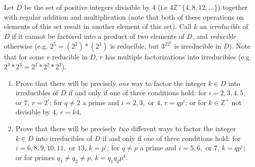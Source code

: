 \documentclass[letterpaper,12pt]{article}
\def\Z{\mathbb Z}
\begin{document}
Let $D$ be the set of positive integers divisible by 4 (i.e $4\Z^+\{4,8,12,\dots\}$) together with regular addition and multiplication (note that both of these operations on elements of this set result in another element of this set).
Call $k$ an \emph{irreducible} of $D$ if it cannot be factored into a product of two elements of $D$, and \emph{reducible} otherwise (e.g. $2^5=(2^2)*(2^3)$ is reducible, but $3^22^3$ is irreducible in $D$). Note that for some $r$ reducible in $D$, $r$ has multiple factorizations into irreducibles (e.g. $2^3*2^3=2^2*2^2*2^2$).

\begin{enumerate}
\item Prove that there will be precisely \emph{one} way to factor the integer $k\in D$ into irreducibles of $D$ if and only if one of three conditions hold:  for $i=2,3,4,5,$ or $7$, $r=2^i$; for $q\ne 2$ a prime and $i=2,3,$ or $4$, $r=qp^i$; or for $k\in \mathbb Z^+$ not divisible by 4, $r=k4$.

\item  Prove that there will be precisely \emph{two} different ways to factor the integer $k\in D$ into irreducibles of $D$ if and only if one of three conditions hold: for $i=6,8,9,10,11,$ or $13$, $k=p^i$; for $q\ne p$ a prime and $i=5,6,$ or $7$, $k=qp^i$; or for primes $q_1\ne q_2\ne p$, $k=q_1q_2p^4$.

\end{enumerate}
\end{document}
